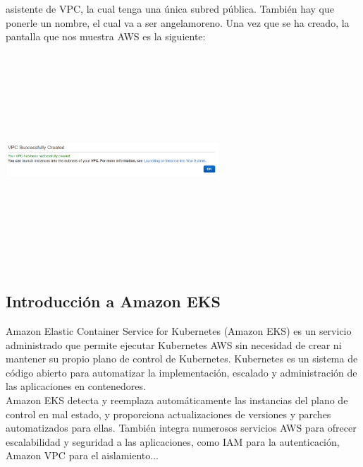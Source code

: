 \documentclass[english,runningheads,a4paper]{llncs}[2018/03/10]
\newenvironment{nscenter}
 {\parskip=0pt\par\nopagebreak\centering}
 {\par\noindent\ignorespacesafterend}
\begin{document}
asistente de VPC, la cual tenga una única subred pública. También hay que 
ponerle un nombre, el cual va a ser angelamoreno. Una vez que se ha creado, la 
pantalla que nos muestra AWS es la siguiente: 
\newline
\begin{nscenter}
\includegraphics[width=8cm,height=8cm,keepaspectratio]{./Contenedores/AWS/32.png}
\end{nscenter}
\newline
\newpage
\subsection*{Introducción a Amazon EKS}
Amazon Elastic Container Service for Kubernetes (Amazon EKS) es un servicio 
administrado que permite ejecutar Kubernetes AWS sin necesidad de crear ni 
mantener su propio plano de control de Kubernetes. Kubernetes es un sistema de 
código abierto para automatizar la implementación, escalado y administración de 
las aplicaciones en contenedores. \\
Amazon EKS detecta y reemplaza automáticamente las instancias del plano de 
control en mal estado, y proporciona actualizaciones de versiones y parches 
automatizados para ellas. También integra numerosos servicios AWS para ofrecer 
escalabilidad y seguridad a las aplicaciones, como IAM para la autenticación, 
Amazon VPC para el aislamiento...
\end{document}
